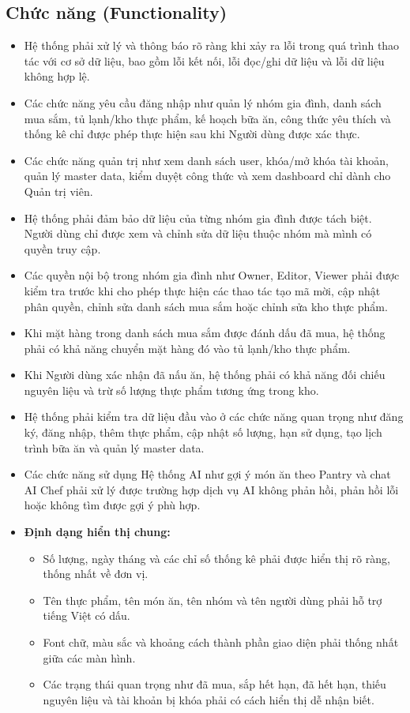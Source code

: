 \documentclass[../main.tex]{subfiles}
\begin{document}
\subsection{Chức năng (Functionality)}
\begin{itemize}
    \item Hệ thống phải xử lý và thông báo rõ ràng khi xảy ra lỗi trong quá trình thao tác với cơ sở dữ liệu, bao gồm lỗi kết nối, lỗi đọc/ghi dữ liệu và lỗi dữ liệu không hợp lệ.
    \item Các chức năng yêu cầu đăng nhập như quản lý nhóm gia đình, danh sách mua sắm, tủ lạnh/kho thực phẩm, kế hoạch bữa ăn, công thức yêu thích và thống kê chỉ được phép thực hiện sau khi Người dùng được xác thực.
    \item Các chức năng quản trị như xem danh sách user, khóa/mở khóa tài khoản, quản lý master data, kiểm duyệt công thức và xem dashboard chỉ dành cho Quản trị viên.
    \item Hệ thống phải đảm bảo dữ liệu của từng nhóm gia đình được tách biệt. Người dùng chỉ được xem và chỉnh sửa dữ liệu thuộc nhóm mà mình có quyền truy cập.
    \item Các quyền nội bộ trong nhóm gia đình như Owner, Editor, Viewer phải được kiểm tra trước khi cho phép thực hiện các thao tác tạo mã mời, cập nhật phân quyền, chỉnh sửa danh sách mua sắm hoặc chỉnh sửa kho thực phẩm.
    \item Khi mặt hàng trong danh sách mua sắm được đánh dấu đã mua, hệ thống phải có khả năng chuyển mặt hàng đó vào tủ lạnh/kho thực phẩm.
    \item Khi Người dùng xác nhận đã nấu ăn, hệ thống phải có khả năng đối chiếu nguyên liệu và trừ số lượng thực phẩm tương ứng trong kho.
    \item Hệ thống phải kiểm tra dữ liệu đầu vào ở các chức năng quan trọng như đăng ký, đăng nhập, thêm thực phẩm, cập nhật số lượng, hạn sử dụng, tạo lịch trình bữa ăn và quản lý master data.
    \item Các chức năng sử dụng Hệ thống AI như gợi ý món ăn theo Pantry và chat AI Chef phải xử lý được trường hợp dịch vụ AI không phản hồi, phản hồi lỗi hoặc không tìm được gợi ý phù hợp.
    \item \textbf{Định dạng hiển thị chung:}
    \begin{itemize}
        \item Số lượng, ngày tháng và các chỉ số thống kê phải được hiển thị rõ ràng, thống nhất về đơn vị.
        \item Tên thực phẩm, tên món ăn, tên nhóm và tên người dùng phải hỗ trợ tiếng Việt có dấu.
        \item Font chữ, màu sắc và khoảng cách thành phần giao diện phải thống nhất giữa các màn hình.
        \item Các trạng thái quan trọng như đã mua, sắp hết hạn, đã hết hạn, thiếu nguyên liệu và tài khoản bị khóa phải có cách hiển thị dễ nhận biết.
    \end{itemize}
\end{itemize}
\end{document}
